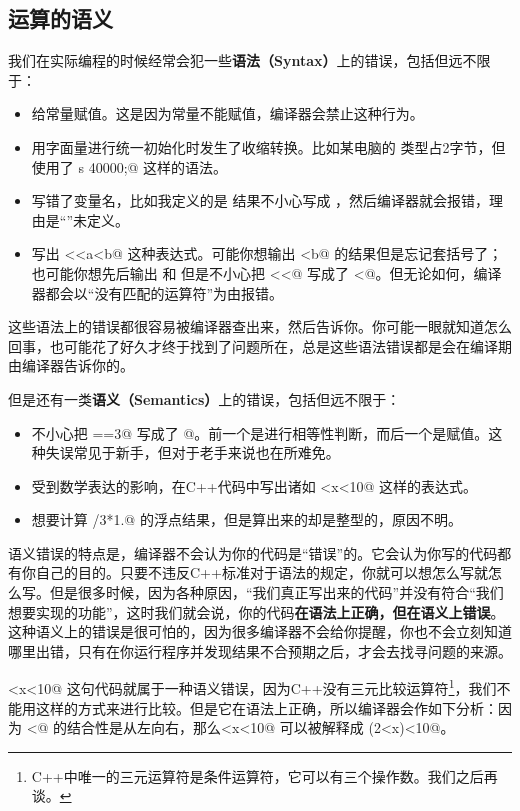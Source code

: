 \subsection*{运算的语义}
我们在实际编程的时候经常会犯一些\textbf{语法（Syntax）}上的错误，包括但远不限于：
\begin{itemize}
    \item 给常量赋值。这是因为常量不能赋值，编译器会禁止这种行为。
    \item 用字面量进行统一初始化时发生了收缩转换。比如某电脑的 \lstinline@short@ 类型占2字节，但使用了 \lstinline@short s {40000};@ 这样的语法。
    \item 写错了变量名，比如我定义的是 \lstinline@num@ 结果不小心写成 \lstinline@nun@，然后编译器就会报错，理由是``\lstinline@nun@''未定义。
    \item 写出 \lstinline@cout<<a<b@ 这种表达式。可能你想输出 \lstinline@a<b@ 的结果但是忘记套括号了；也可能你想先后输出 \lstinline@a@ 和 \lstinline@b@ 但是不小心把 \lstinline@<<@ 写成了 \lstinline@<@。但无论如何，编译器都会以``没有匹配的运算符''为由报错。
\end{itemize}
这些语法上的错误都很容易被编译器查出来，然后告诉你。你可能一眼就知道怎么回事，也可能花了好久才终于找到了问题所在，总是这些语法错误都是会在编译期由编译器告诉你的。\par
但是还有一类\textbf{语义（Semantics）}上的错误，包括但远不限于：
\begin{itemize}
    \item 不小心把 \lstinline@a==3@ 写成了 @。前一个是进行相等性判断，而后一个是赋值。这种失误常见于新手，但对于老手来说也在所难免。
    \item 受到数学表达的影响，在C++代码中写出诸如 <x<10@ 这样的表达式。
    \item 想要计算 /3*1.@ 的浮点结果，但是算出来的却是整型的，原因不明。
\end{itemize}
语义错误的特点是，编译器不会认为你的代码是``错误''的。它会认为你写的代码都有你自己的目的。只要不违反C++标准对于语法的规定，你就可以想怎么写就怎么写。但是很多时候，因为各种原因，``我们真正写出来的代码''并没有符合``我们想要实现的功能''，这时我们就会说，你的代码\textbf{在语法上正确，但在语义上错误}。这种语义上的错误是很可怕的，因为很多编译器不会给你提醒，你也不会立刻知道哪里出错，只有在你运行程序并发现结果不合预期之后，才会去找寻问题的来源。\par
{}<x<10@ 这句代码就属于一种语义错误，因为C++没有三元比较运算符\footnote{C++中唯一的三元运算符是条件运算符，它可以有三个操作数。我们之后再谈。}，我们不能用这样的方式来进行比较。但是它在语法上正确，所以编译器会作如下分析：因为 \lstinline@<@ 的结合性是从左向右，那么<x<10@ 可以被解释成 \lstinline@(2<x)<10@。\par
